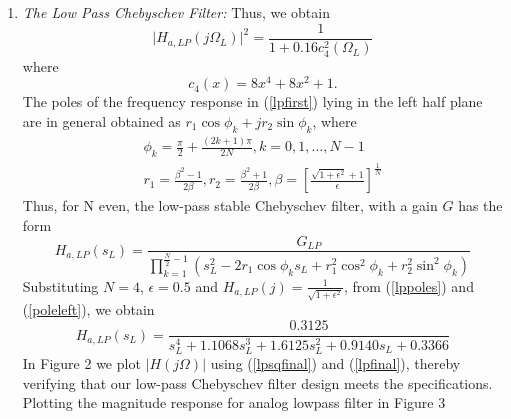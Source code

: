 \documentclass{article}
\begin{document}
\begin{enumerate}

\item {\em The Low Pass Chebyschev Filter:} Thus, we obtain
\begin{equation}
\label{lpsqfinal}
\vert H_{a,LP}(j\Omega_L)\vert^2 = \frac{1}{1 + 0.16c_4^2(\Omega_L)}
\end{equation}
where
\begin{equation}
c_4(x) = 8x^4 + 8x^2 + 1.	
\end{equation}
The poles of the frequency response in (\ref{lpfirst}) lying in the left half plane are in general obtained as 
$r_1\cos\phi_k + jr_2\sin \phi_k$, where
\begin{eqnarray}
\label{lppoles}
\phi_k = \frac{\pi}{2} + \frac{(2k+1)\pi}{2N}, k = 0, 1, \dots, N-1 \nonumber \\
r_1 = \frac{\beta^2 - 1}{2\beta}, r_2 = \frac{\beta^2 + 1}{2\beta}, \beta = \left[ \frac{\sqrt{1 + \epsilon^2} + 1}{\epsilon}\right]^{\frac{1}{N}}
\end{eqnarray}
Thus, for N even, the low-pass stable Chebyschev filter, with a gain $G$ has the form
\begin{equation}
\label{poleleft}
H_{a,LP}(s_L) = \frac{G_{LP}}{\prod_{k = 1}^{\frac{N}{2}-1}(s_L^2 - 2r_1\cos\phi_ks_L + r_1^2\cos^2\phi_k + r_2^2 \sin^2\phi_k)}
\end{equation}
Substituting $N = 4$, $\epsilon = 0.5$ and $H_{a,LP}(j) = \frac{1}{\sqrt{1+\epsilon^2}}$, from (\ref{lppoles}) and (\ref{poleleft}), we obtain 
\begin{equation}
\label{lpfinal}
H_{a,LP}(s_L) = \frac{0.3125}{s_L^4 + 1.1068s_L^3 + 1.6125s_L^2+0.9140s_L + 0.3366}
\end{equation}
In Figure 2 we plot $|H(j\Omega)|$ using (\ref{lpsqfinal}) and (\ref{lpfinal}), thereby verifying that our low-pass Chebyschev filter design meets the specifications.
Plotting the magnitude response for analog lowpass filter in Figure 3
\begin{figure}
\label{fig3}

\end{figure}
\end{enumerate}
\end{document}
